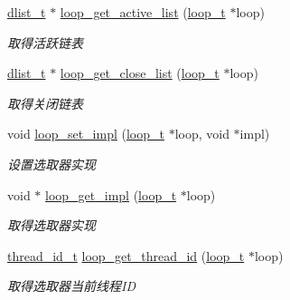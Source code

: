 \begin{DoxyCompactItemize}
\hyperlink{a00051_ad6644d67df4b4e3596c1eb12977d1d16_ad6644d67df4b4e3596c1eb12977d1d16}{dlist\+\_\+t} $\ast$ \hyperlink{a00070_a7c1a2360919bfff72d665f2651a8d080_a7c1a2360919bfff72d665f2651a8d080}{loop\+\_\+get\+\_\+active\+\_\+list} (\hyperlink{a00051_a9c3ad1cd2de83e09f3a7b59fa82c94ee_a9c3ad1cd2de83e09f3a7b59fa82c94ee}{loop\+\_\+t} $\ast$loop)
\begin{DoxyCompactList}\small\item\em 取得活跃链表 \end{DoxyCompactList}\item 
\hyperlink{a00051_ad6644d67df4b4e3596c1eb12977d1d16_ad6644d67df4b4e3596c1eb12977d1d16}{dlist\+\_\+t} $\ast$ \hyperlink{a00070_a282fa587372c0abd536f46a396cd41d4_a282fa587372c0abd536f46a396cd41d4}{loop\+\_\+get\+\_\+close\+\_\+list} (\hyperlink{a00051_a9c3ad1cd2de83e09f3a7b59fa82c94ee_a9c3ad1cd2de83e09f3a7b59fa82c94ee}{loop\+\_\+t} $\ast$loop)
\begin{DoxyCompactList}\small\item\em 取得关闭链表 \end{DoxyCompactList}\item 
void \hyperlink{a00070_aa9654f1b872059f74665506fd67c9bc5_aa9654f1b872059f74665506fd67c9bc5}{loop\+\_\+set\+\_\+impl} (\hyperlink{a00051_a9c3ad1cd2de83e09f3a7b59fa82c94ee_a9c3ad1cd2de83e09f3a7b59fa82c94ee}{loop\+\_\+t} $\ast$loop, void $\ast$impl)
\begin{DoxyCompactList}\small\item\em 设置选取器实现 \end{DoxyCompactList}\item 
void $\ast$ \hyperlink{a00070_a0f78295541723911955dd41b71ceece1_a0f78295541723911955dd41b71ceece1}{loop\+\_\+get\+\_\+impl} (\hyperlink{a00051_a9c3ad1cd2de83e09f3a7b59fa82c94ee_a9c3ad1cd2de83e09f3a7b59fa82c94ee}{loop\+\_\+t} $\ast$loop)
\begin{DoxyCompactList}\small\item\em 取得选取器实现 \end{DoxyCompactList}\item 
\hyperlink{a00051_ad0ada5642d10ce71bdd90816182f9b79_ad0ada5642d10ce71bdd90816182f9b79}{thread\+\_\+id\+\_\+t} \hyperlink{a00070_a1a9b3ef7cb2655dbabeabeeae2f8f299_a1a9b3ef7cb2655dbabeabeeae2f8f299}{loop\+\_\+get\+\_\+thread\+\_\+id} (\hyperlink{a00051_a9c3ad1cd2de83e09f3a7b59fa82c94ee_a9c3ad1cd2de83e09f3a7b59fa82c94ee}{loop\+\_\+t} $\ast$loop)
\begin{DoxyCompactList}\small\item\em 取得选取器当前线程\+I\+D \end{DoxyCompactList}\item 

\end{DoxyCompactItemize}
